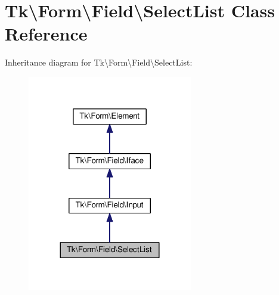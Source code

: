 \hypertarget{classTk_1_1Form_1_1Field_1_1SelectList}{\section{Tk\textbackslash{}Form\textbackslash{}Field\textbackslash{}Select\+List Class Reference}
\label{classTk_1_1Form_1_1Field_1_1SelectList}
}


Inheritance diagram for Tk\textbackslash{}Form\textbackslash{}Field\textbackslash{}Select\+List\+:\nopagebreak
\begin{figure}[H]
\begin{center}
\leavevmode
\includegraphics[width=204pt]{classTk_1_1Form_1_1Field_1_1SelectList__inherit__graph}
\end{center}
\end{figure}
